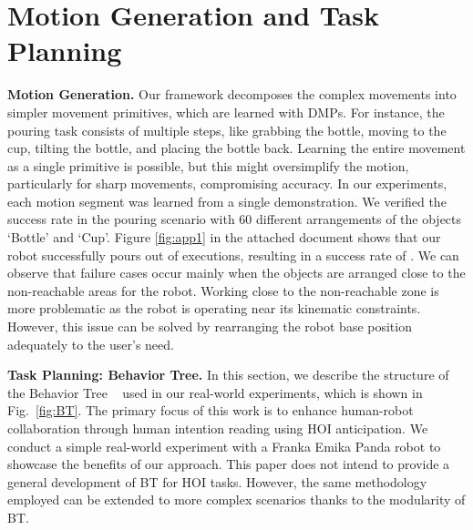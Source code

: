 \documentclass{article}
\begin{document}
\section{Motion Generation and Task Planning}
\label{apx:motion}
\textbf{Motion Generation. }Our framework decomposes the complex movements into simpler movement primitives, which are learned with DMPs. For instance, the pouring task consists of multiple steps, like grabbing the bottle, moving to the cup, tilting the bottle, and placing the bottle back. Learning the entire movement as a single primitive is possible, but this might oversimplify the motion, particularly for sharp movements, compromising accuracy. In our experiments, each motion segment was learned from a single demonstration. We verified the success rate in the pouring scenario with 60 different arrangements of the objects `Bottle' and `Cup'. Figure \ref{fig:app1} in the attached document shows that our robot successfully pours  out of  executions, resulting in a success rate of . We can observe that failure cases occur mainly when the objects are arranged close to the non-reachable areas for the robot. Working close to the non-reachable zone is more problematic as the robot is operating near its kinematic constraints. However, this issue can be solved by rearranging the robot base position adequately to the user's need. 
    
\textbf{Task Planning: Behavior Tree. } In this section, we describe the structure of the Behavior Tree ~\citep{BehaviorTrees} used in our real-world experiments, which is shown in Fig.~\ref{fig:BT}. The primary focus of this work is to enhance human-robot collaboration through human intention reading using HOI anticipation. We conduct a simple real-world experiment with a Franka Emika Panda robot to showcase the benefits of our approach. This paper does not intend to provide a general development of BT for HOI tasks. However, the same methodology employed can be extended to more complex scenarios thanks to the modularity of BT.

\begin{figure}[]
    
\end{figure}
\end{document}
